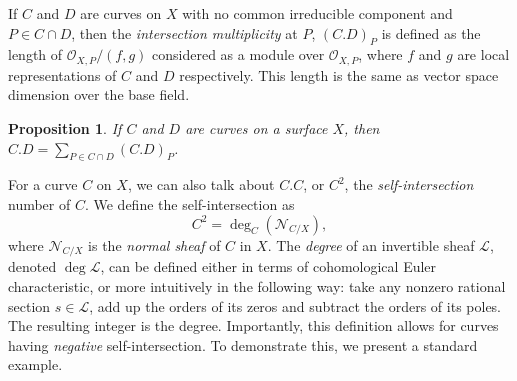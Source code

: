 \documentclass[12pt,twoside]{reedthesis}
\theoremstyle{plain}
\newtheorem{proposition}[theorem]{Proposition}
\theoremstyle{definition}
\theoremstyle{remark}
\newcommand{\calO}{\mathcal{O}}
\newcommand{\calL}{\mathcal{L}}
\begin{document}
\noindent If $C$ and $D$ are curves on $X$ with no common irreducible component and $P\in C\cap D$, then the \emph{intersection multiplicity} at $P$, $(C.D)_P$ is defined as the length of $\calO_{X,P}/(f,g)$ considered as a module over $\calO_{X,P}$, where $f$ and $g$ are local representations of $C$ and $D$ respectively. This length is the same as vector space dimension over the base field.
\begin{proposition}
 If $C$ and $D$ are curves on a surface $X$, then $C.D=\sum_{P\in C\cap D} (C.D)_P$.
\end{proposition}
For a curve $C$ on $X$, we can also talk about $C.C$, or $C^2$, the \emph{self-intersection} number of $C$. We define the self-intersection as \[C^2=\deg_C(\mathscr{N}_{C/X}),\] where $\mathscr{N}_{C/X}$ is the \emph{normal sheaf} of $C$ in $X$. The \emph{degree} of an invertible sheaf $\calL$, denoted $\deg\calL$, can be defined either in terms of cohomological Euler characteristic, or more intuitively in the following way: take any nonzero rational section $s\in\calL$, add up the orders of its zeros and subtract the orders of its poles. The resulting integer is the degree. Importantly, this definition allows for curves having \emph{negative} self-intersection. To demonstrate this, we present a standard example.
\end{document}
